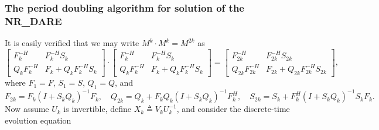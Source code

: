 \begin{figure*}[t]

\end{figure*}

\subsubsection{The period doubling algorithm for solution of the NR_DARE}\label{subsec:Ddoubling}

It is easily verified that we may write $M^k\cdot M^k = M^{2k}$ as
\begin{equation}
\label{eq:idenperdub}
\begin{bmatrix}  F_k^{-H} & F_k^{-H}S_k \\ Q_k F_k^{-H} & F_k+ Q_k F_k^{-H}S_k  \end{bmatrix} \cdot \begin{bmatrix} F_k^{-H} & F_k^{-H}S_k \\ Q_k F_k^{-H} & F_k+ Q_k F_k^{-H}S_k  \end{bmatrix} =
\begin{bmatrix} F_{2k}^{-H} & F_{2k}^{-H}S_{2k} \\ Q_{2k} F_{2k}^{-H} & F_{2k}+ Q_{2k} F_{2k}^{-H}S_{2k} \end{bmatrix},
\end{equation}
where $F_1=F$, $S_1=S$, $Q_1=Q$, and
\begin{equation}
F_{2k} = F_k (I+ S_k Q_k)^{-1} F_k, \quad Q_{2k} = Q_k + F_k Q_k (I+S_k Q_k)^{-1} F^H_k, \quad S_{2k} = S_k + F^H_k (I+S_k Q_k)^{-1}  S_k F_k.
\label{eq:perdubiter}
\end{equation}
Now assume $U_k$ is invertible, define $X_k \triangleq V_k U_k^{-1}$, and consider the discrete-time evolution equation
